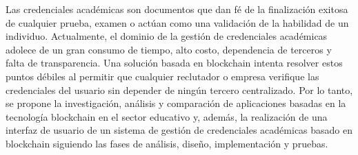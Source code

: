 \begin{resumen}
Las credenciales académicas son documentos que dan fé de la finalización exitosa de cualquier prueba, examen o actúan como una validación de la habilidad de un individuo. Actualmente, el dominio de la gestión de credenciales académicas adolece de un gran consumo de tiempo, alto costo, dependencia de terceros y falta de transparencia. Una solución basada en blockchain intenta resolver estos puntos débiles al permitir que cualquier reclutador o empresa verifique las credenciales del usuario sin depender de ningún tercero centralizado. Por lo tanto, se propone la investigación, análisis y comparación de aplicaciones basadas en la tecnología blockchain en el sector educativo y, además, la realización de una interfaz de usuario de un sistema de gestión de credenciales académicas basado en blockchain siguiendo las fases de análisis, diseño, implementación y pruebas.







\end{resumen}
